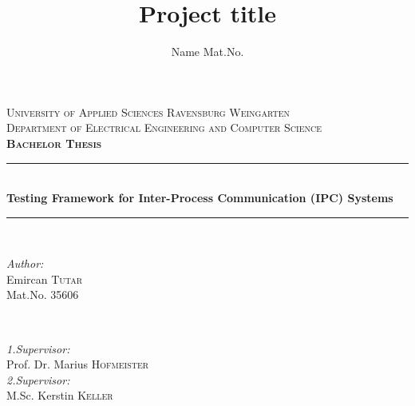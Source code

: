 \documentclass[a4paper,11pt,singlespacing]{article}
\title{Project title}
\author{
	Name Mat.No.
	}
\begin{document}
\setlength{\parindent}{0ex}

\begin{titlepage}
	
	\newcommand{\HRule}{\rule{\linewidth}{0.5mm}} %
	
	\center %
	
	
	\textsc{\LARGE University of Applied Sciences Ravensburg Weingarten}\\[1.5cm] %
	\textsc{\Large Department of
		Electrical Engineering
		and Computer Science}\\[0.5cm] %
	\textsc{\large  \textbf{Bachelor Thesis}}\\[0.5cm] %
	
	
	\HRule \\[0.4cm]
	{ \huge \bfseries Testing Framework for Inter-Process
		Communication (IPC) Systems}\\[0.4cm] %
	\HRule \\[1.5cm]
	
	
	\begin{minipage}{0.4\textwidth}
		\begin{flushleft} \large
			\emph{Author:}\\
            Emircan \textsc{Tutar}\\ %
			Mat.No. 35606 \\
		\end{flushleft}
	\end{minipage}
	~
	\begin{minipage}{0.5\textwidth}
		\begin{flushleft} \large
			\emph{1.Supervisor:} \\
			Prof. Dr. Marius \textsc{Hofmeister} \\ %
			\emph{2.Supervisor:} \\
			M.Sc. Kerstin \textsc{Keller} %
		\end{flushleft}
	\end{minipage}\\[2cm]
	

\end{titlepage}
\end{document}

